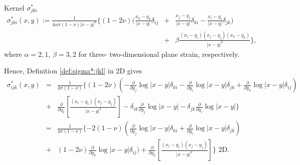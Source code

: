 \begin{definition}\label{def:sigma*:jkl} Kernel $\sigma^{*}_{jki}$\\
\begin{eqnarray}
\sigma^{*}_{jki}(x,y):=\frac{1}{4\alpha \pi (1-\nu) |x-y|^{\alpha}} \{ (1-2\nu)(\frac{x_k-y_k}{|x-y|}\delta_{ij}&+&\frac{x_j-y_j}{|x-y|}\delta_{ki}-\frac{x_i-y_i}{|x-y|}\delta_{jk}) \nonumber \\
 &+&\beta\frac{(x_i-y_i)(x_j-y_j)(x_k-y_k)}{|x-y|^3}\}, \nonumber
\end{eqnarray}
where $\alpha=2,1$, $\beta=3,2$ for three- two-dimensional plane strain, respectively.
\end{definition}
Hence, Definition \ref{def:sigma*:jkl} in 2D gives
\begin{eqnarray}
\sigma^{*}_{ijk}(x,y)&=&\frac{1}{4 \pi (1-\nu) } \{ (1-2\nu)(-\frac{\partial}{\partial y_j}\log|x-y|\delta_{ki}-\frac{\partial}{\partial y_i}\log|x-y|\delta_{jk}+\frac{\partial}{\partial y_k}\log|x-y|\delta_{ij}) \nonumber \\
&+&
\frac{\partial}{\partial y_k}\left[\frac{(x_i-y_i)(x_j-y_j)}{|x-y|^2}\right]-\delta_{ik}\frac{\partial}{\partial y_j}\log|x-y|-\delta_{jk}\frac{\partial}{\partial y_i}\log|x-y| \}\nonumber \\
&=&\frac{1}{4 \pi (1-\nu) } \{- 2(1-\nu)(\frac{\partial}{\partial y_j}\log|x-y|\delta_{ki}+\frac{\partial}{\partial y_i}\log|x-y|\delta_{jk}) \nonumber \\
&+&(1-2\nu)\frac{\partial}{\partial y_k}\log|x-y|\delta_{ij})+\frac{\partial}{\partial y_k}\left[\frac{(x_i-y_i)(x_j-y_j)}{|x-y|^2}\right] \} \mbox{ 2D}.\nonumber
\end{eqnarray}

